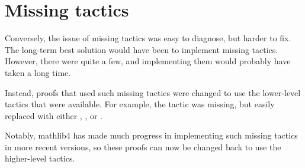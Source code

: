 \section{Missing tactics} 
Conversely, the issue of missing tactics was easy to diagnose, but harder to fix.
The long-term best solution would have been to implement missing tactics.
However, there were quite a few, and implementing them would probably have taken a long time.

Instead, proofs that used such missing tactics were changed to use the lower-level tactics that were
available. For example, the  tactic
was missing, but easily replaced with either , , or .

Notably, mathlib4 has made much progress in implementing such missing tactics in more recent versions, 
so these proofs can now be changed back to use the higher-level tactics.



